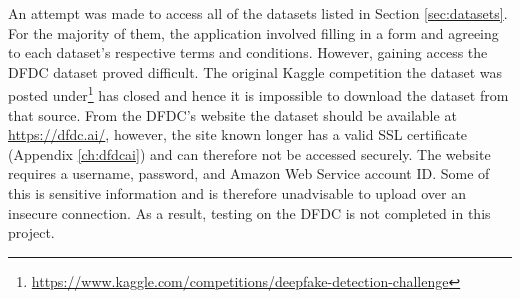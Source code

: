 An attempt was made to access all of the datasets listed in Section \ref{sec:datasets}. For the majority of them, the application involved filling in a form and agreeing to each dataset's respective terms and conditions. However, gaining access the DFDC dataset\cite{dolhansky2020deepfake} proved difficult. The original Kaggle competition the dataset was posted under\footnote{\url{https://www.kaggle.com/competitions/deepfake-detection-challenge}} has closed and hence it is impossible to download the dataset from that source. From the DFDC's website the dataset should be available at \url{https://dfdc.ai/}, however, the site known longer has a valid SSL certificate (Appendix \ref{ch:dfdcai}) and can therefore not be accessed securely. The website requires a username, password, and Amazon Web Service account ID. Some of this is sensitive information and is therefore unadvisable to upload over an insecure connection. As a result, testing on the DFDC is not completed in this project.